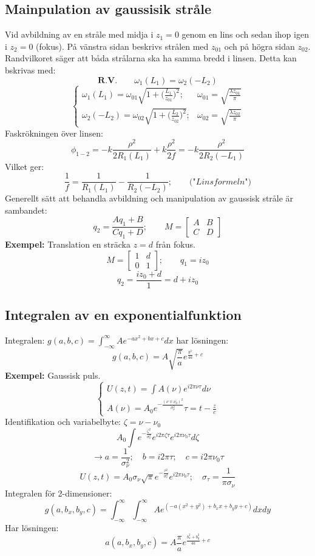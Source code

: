 \documentclass{article}
\begin{document}
  \subsection{Mainpulation av gaussisik stråle}
    Vid avbildning av en stråle med midja i $z_1=0$ genom en lins och sedan ihop igen i $z_2=0$ (fokus). På vänstra sidan beskrivs strålen med $z_{01}$ och på högra sidan $z_{02}$. Randvilkoret säger att båda strålarna ska ha samma bredd i linsen. Detta kan bskrivas med:
    \[
      \textbf{R.V.}\qquad\omega_1(L_1)=\omega_2(-L_2)
    \]
    \[
      \begin{cases}
        \omega_1(L_1)=\omega_{01}\sqrt{1+\big(\frac{L_1}{z_{01}}\big)^2};&\omega_{01}=\sqrt{\frac{\lambda z_{01}}{\pi}}\\
        \omega_2(-L_2)=\omega_{02}\sqrt{1+\big(\frac{L_2}{z_{02}}\big)^2};&\omega_{02}=\sqrt{\frac{\lambda z_{02}}{\pi}}
      \end{cases}
    \]
    Faskrökningen över linsen:
    \[
      \phi_{1-2}=-k\frac{\rho^2}{2R_1(L_1)}+k\frac{\rho^2}{2f}=-k\frac{\rho^2}{2R_2(-L_1)}
    \]
    Vilket ger:
    \[
      \frac{1}{f}=\frac{1}{R_1(L_1)}-\frac{1}{R_2(-L_2)};\qquad\textit{("Linsformeln")}
    \]
    Generellt sätt att behandla avbildning och manipulation av gaussisk stråle är sambandet:
    \[
      q_2=\frac{Aq_1+B}{Cq_1+D};\qquad M=
      \begin{bmatrix}
        A&B\\
        C&D
      \end{bmatrix}
    \]
    \textbf{Exempel:} Translation en sträcka $z=d$ från fokus.
    \[
      M=
      \begin{bmatrix}
        1&d\\
        0&1
      \end{bmatrix};\qquad q_1=iz_0
    \]
    \[
      q_2=\frac{iz_0+d}{1}=d+iz_0
    \]
  \subsection{Integralen av en exponentialfunktion}
    Integralen: $g(a,b,c)=\int_{-\infty}^{\infty}Ae^{-ax^2+bx+c}dx$ har lösningen:
    \[
      g(a,b,c)=A\sqrt{\frac{\pi}{a}}e^{\frac{b^2}{4a}+c}
    \]
    \textbf{Exempel:} Gaussisk puls.
    \[
      \begin{cases}
        U(z,t)=\int A(\nu)e^{i2\pi \nu\tau}d\nu\\
        A(\nu)=A_0e^{-\frac{(\nu\mp\nu_0)^2}{\sigma_{\nu}^2}}
        \tau=t-\frac{z}{c}
      \end{cases}
    \]
    Identifikation och variabelbyte: $\zeta=\nu-\nu_0$
    \[
      A_0\int e^{-\frac{\zeta^2}{\sigma_{\nu}^2}}e^{i2\pi\zeta\tau}e^{i2\pi\nu_0\tau}d\zeta
    \]
    \[
      \rightarrow a=\frac{1}{\sigma_{\nu}^2};\quad b=i2\pi\tau;\quad c=i2\pi\nu_0\tau
    \]
    \[
      U(z,t)=A_0\sigma_{\nu}\sqrt{\pi}e^{-\frac{\tau^2}{\sigma_{\tau}^2}}e^{i2\pi\nu_0\tau};\quad\sigma_{\tau}=\frac{1}{\pi\sigma_{\nu}}
    \]
    Integralen för 2-dimensioner:
    \[
      g(a,b_x,b_y,c)=\int_{-\infty}^{\infty}\int_{-\infty}^{\infty} Ae^{(-a(x^2+y^2)+b_xx+b_yy+c)}dxdy
    \]
    Har lösningen:
    \[
      a(a,b_x,b_y,c)=A\frac{\pi}{a}e^{\frac{b_x^2+b_y^2}{4a}+c}
    \]
\end{document}
